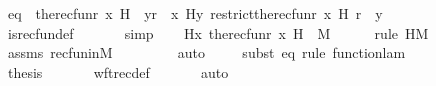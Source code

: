 \begin{isabellebody}
\ eq\ {\isacharcolon}{\kern0pt}\ {\isachardoublequoteopen}the{\isacharunderscore}{\kern0pt}recfun{\isacharparenleft}{\kern0pt}r{\isacharcomma}{\kern0pt}\ x{\isacharcomma}{\kern0pt}\ H{\isacharparenright}{\kern0pt}\ {\isacharequal}{\kern0pt}\ {\isacharparenleft}{\kern0pt}{\isasymlambda}y{\isasymin}r\ {\isacharminus}{\kern0pt}{\isacharbackquote}{\kern0pt}{\isacharbackquote}{\kern0pt}\ {\isacharbraceleft}{\kern0pt}x{\isacharbraceright}{\kern0pt}{\isachardot}{\kern0pt}\ H{\isacharparenleft}{\kern0pt}y{\isacharcomma}{\kern0pt}\ restrict{\isacharparenleft}{\kern0pt}the{\isacharunderscore}{\kern0pt}recfun{\isacharparenleft}{\kern0pt}r{\isacharcomma}{\kern0pt}\ x{\isacharcomma}{\kern0pt}\ H{\isacharparenright}{\kern0pt}{\isacharcomma}{\kern0pt}\ r\ {\isacharminus}{\kern0pt}{\isacharbackquote}{\kern0pt}{\isacharbackquote}{\kern0pt}\ {\isacharbraceleft}{\kern0pt}y{\isacharbraceright}{\kern0pt}{\isacharparenright}{\kern0pt}{\isacharparenright}{\kern0pt}{\isacharparenright}{\kern0pt}{\isachardoublequoteclose}\ \isanewline
\ \ \ \ \isamarkupfalse%
\ is{\isacharunderscore}{\kern0pt}recfun{\isacharunderscore}{\kern0pt}def\ \isanewline
\ \ \ \ \isamarkupfalse%
\ simp\isanewline
\isanewline
\ \ \isamarkupfalse%
\ {\isachardoublequoteopen}H{\isacharparenleft}{\kern0pt}x{\isacharcomma}{\kern0pt}\ the{\isacharunderscore}{\kern0pt}recfun{\isacharparenleft}{\kern0pt}r{\isacharcomma}{\kern0pt}\ x{\isacharcomma}{\kern0pt}\ H{\isacharparenright}{\kern0pt}{\isacharparenright}{\kern0pt}\ {\isasymin}\ M{\isachardoublequoteclose}\ \isanewline
\ \ \ \ \isamarkupfalse%
{\isacharparenleft}{\kern0pt}rule\ HM{\isacharparenright}{\kern0pt}\isanewline
\ \ \ \ \isamarkupfalse%
\ assms\ recfuninM\ \isanewline
\ \ \ \ \ \ \isamarkupfalse%
\ auto{\isacharbrackleft}{\kern0pt}{}{\isacharbrackright}{\kern0pt}\isanewline
\ \ \ \ \isamarkupfalse%
{\isacharparenleft}{\kern0pt}subst\ eq{\isacharcomma}{\kern0pt}\ rule\ function{\isacharunderscore}{\kern0pt}lam{\isacharparenright}{\kern0pt}\isanewline
\ \ \ \ \isamarkupfalse%
\isanewline
\ \ \isamarkupfalse%
\ \isamarkupfalse%
\ {\isacharquery}{\kern0pt}thesis\ \isanewline
\ \ \ \ \isamarkupfalse%
\ wftrec{\isacharunderscore}{\kern0pt}def\ \isanewline
\ \ \ \ \isamarkupfalse%
\ auto\isanewline
{}\isamarkupfalse%
%
\endisatagproof
{\isafoldproof}%
%
\isadelimproof
\isanewline
%
\endisadelimproof
\isanewline
\isanewline

\end{isabellebody}
